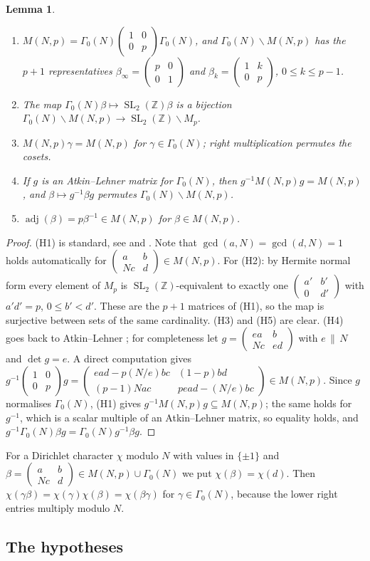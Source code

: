 \documentclass[11pt,a4paper]{article}
\newtheorem{lemma}[theorem]{Lemma}
\theoremstyle{definition}\newtheorem{definition}[theorem]{Definition}
\theoremstyle{remark}\newtheorem{remark}[theorem]{Remark}
\newcommand{\Z}{\mathbb Z}
\DeclareMathOperator{\SL}{SL}
\DeclareMathOperator{\adj}{adj}
\newcommand{\bmat}[4]{\left(\begin{smallmatrix}#1&#2\\#3&#4\end{smallmatrix}\right)}
\numberwithin{equation}{section}
\begin{document}
\begin{lemma}\label{B:lem:hecke}
\begin{enumerate}[label=\textup{(H\arabic*)}]
\item $M(N,p)=\Gamma_0(N)\bmat100p\Gamma_0(N)$, and $\Gamma_0(N)\backslash M(N,p)$ has the $p+1$
representatives $\beta_\infty=\bmat p001$ and $\beta_k=\bmat1k0p$, $0\le k\le p-1$.
\item The map $\Gamma_0(N)\beta\mapsto\SL_2(\Z)\beta$ is a bijection
$\Gamma_0(N)\backslash M(N,p)\to\SL_2(\Z)\backslash M_p$.
\item $M(N,p)\gamma=M(N,p)$ for $\gamma\in\Gamma_0(N)$; right multiplication permutes the cosets.
\item If $g$ is an Atkin--Lehner matrix for $\Gamma_0(N)$, then $g^{-1}M(N,p)g=M(N,p)$, and
$\beta\mapsto g^{-1}\beta g$ permutes $\Gamma_0(N)\backslash M(N,p)$.
\item $\adj(\beta)=p\beta^{-1}\in M(N,p)$ for $\beta\in M(N,p)$.
\end{enumerate}
\end{lemma}
\begin{proof}
(H1) is standard, see \cite[\S5.2]{DS05} and \cite[\S3]{Beu26}. Note that
$\gcd(a,N)=\gcd(d,N)=1$ holds automatically for $\bmat ab{Nc}d\in M(N,p)$. For (H2): by Hermite normal form every element of $M_p$ is
$\SL_2(\Z)$-equivalent to exactly one $\bmat{a'}{b'}0{d'}$ with $a'd'=p$, $0\le b'<d'$. These
are the $p+1$ matrices of (H1), so the map is surjective between sets of the same cardinality.
(H3) and (H5) are clear. (H4) goes back to Atkin--Lehner \cite{AL70}; for completeness let $g=\bmat{ea}b{Nc}{ed}$ with $e\,\|\,N$ and $\det g=e$. A
direct computation gives
$g^{-1}\bmat100pg=\bmat{ead-p(N/e)bc}{(1-p)bd}{(p-1)Nac}{pead-(N/e)bc}\in M(N,p)$. Since $g$
normalises $\Gamma_0(N)$, (H1) gives $g^{-1}M(N,p)g\subseteq M(N,p)$; the same holds for $g^{-1}$,
which is a scalar multiple of an Atkin--Lehner matrix, so equality holds, and
$g^{-1}\Gamma_0(N)\beta g=\Gamma_0(N)g^{-1}\beta g$.
\end{proof}

For a Dirichlet character $\chi$ modulo $N$ with values in $\{\pm1\}$ and
$\beta=\bmat ab{Nc}d\in M(N,p)\cup\Gamma_0(N)$ we put $\chi(\beta)=\chi(d)$. Then
$\chi(\gamma\beta)=\chi(\gamma)\chi(\beta)=\chi(\beta\gamma)$ for $\gamma\in\Gamma_0(N)$, because the
lower right entries multiply modulo $N$.

\subsection{The hypotheses}
\end{document}
